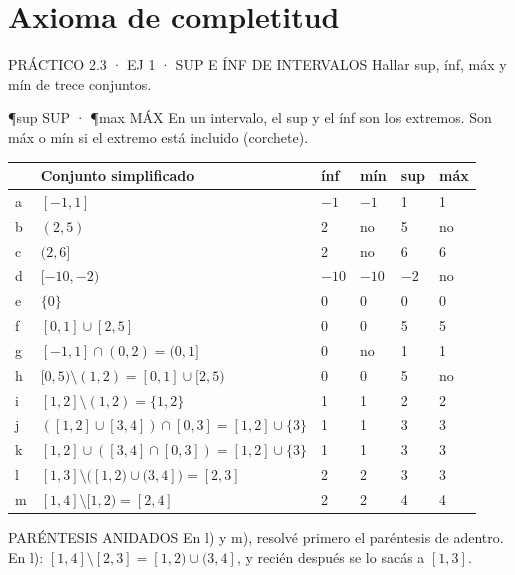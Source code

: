 \section{Axioma de completitud}

\begin{enunciado}{PRÁCTICO 2.3 · EJ 1 · SUP E ÍNF DE INTERVALOS}
Hallar sup, ínf, máx y mín de trece conjuntos.
\end{enunciado}
\begin{uso}{\P{sup} SUP · \P{max} MÁX}
En un intervalo, el sup y el ínf son los extremos. Son máx o mín si el extremo está incluido (corchete).
\end{uso}
\begin{center}\small
\begin{tabularx}{\linewidth}{@{}l X l l l l@{}}\toprule
& Conjunto simplificado & ínf & mín & sup & máx\\\midrule
a & $[-1,1]$ & $-1$ & $-1$ & 1 & 1\\
b & $(2,5)$ & 2 & no & 5 & no\\
c & $(2,6]$ & 2 & no & 6 & 6\\
d & $[-10,-2)$ & $-10$ & $-10$ & $-2$ & no\\
e & $\{0\}$ & 0 & 0 & 0 & 0\\
f & $[0,1]\cup[2,5]$ & 0 & 0 & 5 & 5\\
g & $[-1,1]\cap(0,2)=(0,1]$ & 0 & no & 1 & 1\\
h & $[0,5)\setminus(1,2)=[0,1]\cup[2,5)$ & 0 & 0 & 5 & no\\
i & $[1,2]\setminus(1,2)=\{1,2\}$ & 1 & 1 & 2 & 2\\
j & $([1,2]\cup[3,4])\cap[0,3]=[1,2]\cup\{3\}$ & 1 & 1 & 3 & 3\\
k & $[1,2]\cup([3,4]\cap[0,3])=[1,2]\cup\{3\}$ & 1 & 1 & 3 & 3\\
l & $[1,3]\setminus\big([1,2)\cup(3,4]\big)=[2,3]$ & 2 & 2 & 3 & 3\\
m & $[1,4]\setminus[1,2)=[2,4]$ & 2 & 2 & 4 & 4\\\bottomrule
\end{tabularx}
\end{center}
\begin{trampa}{PARÉNTESIS ANIDADOS}
En l) y m), resolvé primero el paréntesis de adentro. En l): $[1,4]\setminus[2,3]=[1,2)\cup(3,4]$, y recién después se lo sacás a $[1,3]$.
\end{trampa}

